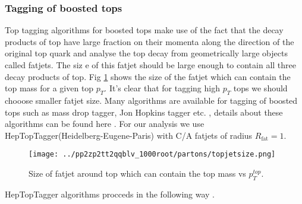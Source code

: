 \documentclass[12pt,a4paper]{article}		%
\begin{document}
\subsubsection{Tagging of boosted tops}

Top tagging algorithms for boosted tops make use of the fact that the decay products of top have large fraction on their momenta along the direction of the original top quark and analyse the top decay from geometrically large objects called fatjets. The siz e of this fatjet should be large enough to contain all three decay products of top. Fig \ref{topjetsize} shows the size of the fatjet which can contain the top mass for a given top $p_T$. It's clear that for tagging high $p_T$ tops we should chooose smaller fatjet size. Many algorithms are available for tagging of boosted tops such as mass drop tagger, Jon Hopkins tagger etc. , details about these algorithms can be found here \cite{toptaggin}. For our analysis we use HepTopTagger(Heidelberg-Eugene-Paris) with C/A fatjets of radius $R_{\text{fat}}=1$.   

\begin{figure}[h]
	\begin{centering}	
		\texttt{[image: ../pp2zp2tt2qqblv\_1000root/partons/topjetsize.png]} 
		\caption{Size of fatjet around top which can contain the top mass vs $p_T^{top}$.}
		\label{topjetsize}
		\centering
	\end{centering} 		
\end{figure}    

HepTopTagger algorithms procceds in the following way \cite{heptop}.
\end{document}
